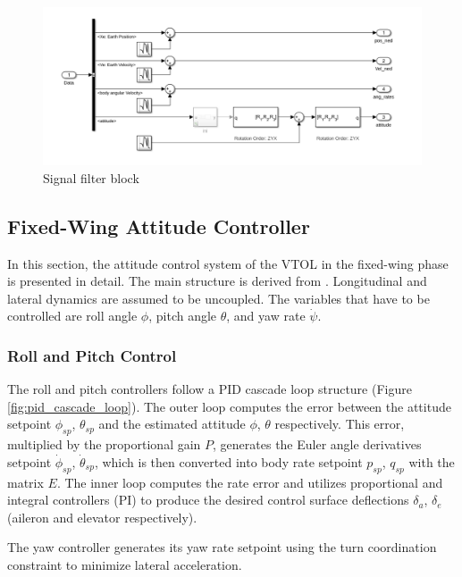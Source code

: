 \begin{figure}[h]
    \centering
    \includegraphics[width=0.95\linewidth]{Images/Current Status.png}
    \caption{Signal filter block}
    \label{fig:signal_filter_block}
\end{figure}

\subsection{Fixed-Wing Attitude Controller}
In this section, the attitude control system of the VTOL in the fixed-wing phase is presented in detail. The main structure is derived from \cite{px4controller}. Longitudinal and lateral dynamics are assumed to be uncoupled. The variables that have to be controlled are roll angle \( \phi \), pitch angle \( \theta \), and yaw rate \( \dot{\psi} \).

\subsubsection{Roll and Pitch Control}
The roll and pitch controllers follow a PID cascade loop structure (Figure \ref{fig:pid_cascade_loop}). The outer loop computes the error between the attitude setpoint \( \phi_{sp} \), \( \theta_{sp} \) and the estimated attitude \( \phi \), \( \theta \) respectively. This error, multiplied by the proportional gain \( P \), generates the Euler angle derivatives setpoint \( \dot{\phi}_{sp} \), \( \dot{\theta}_{sp} \), which is then converted into body rate setpoint \( p_{sp} \), \( q_{sp} \) with the matrix \( E \). The inner loop computes the rate error and utilizes proportional and integral controllers (PI) to produce the desired control surface deflections \( \delta_a \), \( \delta_e \) (aileron and elevator respectively).

The yaw controller generates its yaw rate setpoint using the turn coordination constraint to minimize lateral acceleration.

